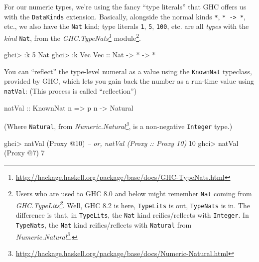 \documentclass[]{article}
\newenvironment{Shaded}{}{}
\newcommand{\DataTypeTok}[1]{\textcolor[rgb]{0.56,0.13,0.00}{#1}}
\newcommand{\DecValTok}[1]{\textcolor[rgb]{0.25,0.63,0.44}{#1}}
\newcommand{\CommentTok}[1]{\textcolor[rgb]{0.38,0.63,0.69}{\textit{#1}}}
\newcommand{\OtherTok}[1]{\textcolor[rgb]{0.00,0.44,0.13}{#1}}
\newcommand{\FunctionTok}[1]{\textcolor[rgb]{0.02,0.16,0.49}{#1}}
\newcommand{\NormalTok}[1]{#1}
\renewcommand{\href}[2]{#2\footnote{\url{#1}}}
\begin{document}
For our numeric types, we're using the fancy ``type literals'' that GHC offers
us with the \texttt{DataKinds} extension. Basically, alongside the normal kinds
\texttt{*}, \texttt{*\ -\textgreater{}\ *}, etc., we also have the \texttt{Nat}
kind; type literals \texttt{1}, \texttt{5}, \texttt{100}, etc. are all
\emph{types} with the \emph{kind} \texttt{Nat}, from the
\emph{\href{http://hackage.haskell.org/package/base/docs/GHC-TypeNats.html}{GHC.TypeNats}}
module\footnote{Users who are used to GHC 8.0 and below might remember
  \texttt{Nat} coming from
  \emph{\href{http://hackage.haskell.org/package/base/docs/GHC-TypeLits.html}{GHC.TypeLits}}.
  Well, GHC 8.2 is here, \texttt{TypeLits} is out, \texttt{TypeNats} is in. The
  difference is that, in \texttt{TypeLits}, the \texttt{Nat} kind
  reifies/reflects with \texttt{Integer}. In \texttt{TypeNats}, the \texttt{Nat}
  kind reifies/reflects with \texttt{Natural} from
  \emph{\href{http://hackage.haskell.org/package/base/docs/Numeric-Natural.html}{Numeric.Natural}}.}.

\begin{Shaded}
\begin{Highlighting}[]
\NormalTok{ghci}\FunctionTok{>} \FunctionTok{:}\NormalTok{k }\DecValTok{5}
\DataTypeTok{Nat}
\NormalTok{ghci}\FunctionTok{>} \FunctionTok{:}\NormalTok{k }\DataTypeTok{Vec}
\DataTypeTok{Vec}\OtherTok{ ::} \DataTypeTok{Nat} \OtherTok{->} \FunctionTok{*} \OtherTok{->} \FunctionTok{*}
\end{Highlighting}
\end{Shaded}

You can ``reflect'' the type-level numeral as a value using the
\texttt{KnownNat} typeclass, provided by GHC, which lets you gain back the
number as a run-time value using \texttt{natVal}: (This process is called
``reflection'')

\begin{Shaded}
\begin{Highlighting}[]
\OtherTok{natVal ::} \DataTypeTok{KnownNat}\NormalTok{ n }\OtherTok{=>}\NormalTok{ p n }\OtherTok{->} \DataTypeTok{Natural}
\end{Highlighting}
\end{Shaded}

(Where \texttt{Natural}, from
\emph{\href{http://hackage.haskell.org/package/base/docs/Numeric-Natural.html}{Numeric.Natural}},
is a non-negative \texttt{Integer} type.)

\begin{Shaded}
\begin{Highlighting}[]
\NormalTok{ghci}\FunctionTok{>}\NormalTok{ natVal (}\DataTypeTok{Proxy} \FunctionTok{@}\DecValTok{10}\NormalTok{)   }\CommentTok{-- or, natVal (Proxy :: Proxy 10)}
\DecValTok{10}
\NormalTok{ghci}\FunctionTok{>}\NormalTok{ natVal (}\DataTypeTok{Proxy} \FunctionTok{@}\DecValTok{7}\NormalTok{)}
\DecValTok{7}
\end{Highlighting}
\end{Shaded}
\end{document}
